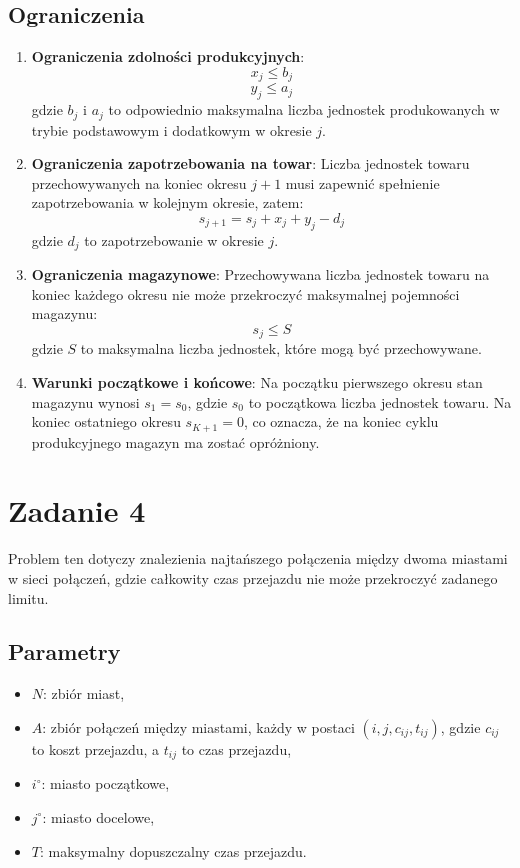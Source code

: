 \documentclass[12pt, letterpaper]{article}
\begin{document}
\subsection{Ograniczenia}
\begin{enumerate}
  \item \textbf{Ograniczenia zdolności produkcyjnych}:
        \[
          x_j \leq b_j
        \]
        \[
          y_j \leq a_j
        \]
        gdzie \( b_j \) i \( a_j \) to odpowiednio maksymalna liczba jednostek
        produkowanych w trybie podstawowym i dodatkowym w okresie \( j \).

  \item \textbf{Ograniczenia zapotrzebowania na towar}:
        Liczba jednostek towaru przechowywanych na koniec okresu \( j+1 \) musi
        zapewnić spełnienie zapotrzebowania w kolejnym okresie, zatem:
        \[
          s_{j+1} = s_j + x_j + y_j - d_j
        \]
        gdzie \( d_j \) to zapotrzebowanie w okresie \( j \).

  \item \textbf{Ograniczenia magazynowe}:
        Przechowywana liczba jednostek towaru na koniec każdego okresu nie może
        przekroczyć maksymalnej pojemności magazynu:
        \[
          s_j \leq S
        \]
        gdzie \( S \) to maksymalna liczba jednostek, które mogą być
        przechowywane.

  \item \textbf{Warunki początkowe i końcowe}:
        Na początku pierwszego okresu stan magazynu wynosi \( s_1 = s_0 \),
        gdzie \( s_0 \) to początkowa liczba jednostek towaru. Na koniec
        ostatniego
        okresu \( s_{K+1} = 0 \), co oznacza, że na koniec cyklu produkcyjnego
        magazyn
        ma zostać opróżniony.
\end{enumerate}

\section{Zadanie 4}
Problem ten dotyczy znalezienia najtańszego połączenia między dwoma miastami w
sieci połączeń, gdzie całkowity czas przejazdu nie może przekroczyć zadanego
limitu.

\subsection{Parametry}
\begin{itemize}
  \item \( N \): zbiór miast,
  \item \( A \): zbiór połączeń między miastami, każdy w postaci \( (i, j,
        c_{ij}, t_{ij}) \), gdzie \( c_{ij} \) to koszt przejazdu, a \( t_{ij}
        \) to czas przejazdu,
  \item \( i^\circ \): miasto początkowe,
  \item \( j^\circ \): miasto docelowe,
  \item \( T \): maksymalny dopuszczalny czas przejazdu.
\end{itemize}
\end{document}
